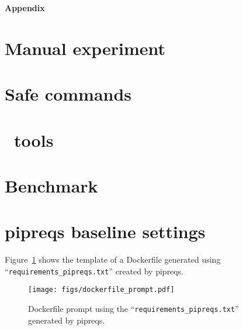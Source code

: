 \newpage
\begin{center}
    \LARGE \textbf{Appendix}
\end{center}
\section{Manual experiment}
\label{manual_experiment}


\section{Safe commands}
\label{safe_commands}


\newpage
\section{\tool~tools}
\label{Repo2Run_tools}


\newpage
\section{Benchmark}
\label{benchmark}


\newpage
\section{pipreqs baseline settings}
Figure~\ref{figs:dockerfile_prompt} shows the template of a Dockerfile generated using ``\texttt{requirements\_pipreqs.txt}'' created by pipreqs.
\label{baseline_settings}
\begin{figure}[h]
	\centering
	\texttt{[image: figs/dockerfile\_prompt.pdf]}
    \captionsetup{aboveskip=-10em, belowskip=-10em}
    
    \caption{Dockerfile prompt using the ``\texttt{requirements\_pipreqs.txt}'' generated by pipreqs.}
\label{figs:dockerfile_prompt}
\end{figure}
